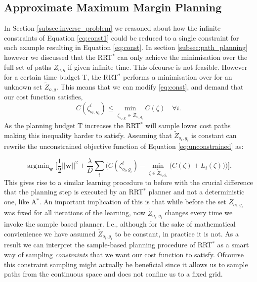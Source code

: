 \documentclass{article}  %
\DeclareMathOperator*{\argmin}{\arg\!\min}
\begin{document}
	\subsection{Approximate Maximum Margin Planning \label{subsec:ammp}}

		In Section \ref{subsec:inverse_problem}  we reasoned about how the infinite constraints of Equation \eqref{eq:const1} could be reduced to a single constraint for each example resulting in Equation \eqref{eq:const}. In section \ref{subsec:path_planning} however we discussed that the RRT$^*$ can only achieve the minimisation over the full set of paths $Z_{o,g}$ if given infinite time.
		This ofcourse is not feasible. However for a certain time budget T, the RRT$^*$ performs a minimisation over for an unknown set $\tilde{Z}_{o,g}$. This means that we can modify \eqref{eq:const}, and demand that our cost function satisfies,
\begin{equation}
	C(\zeta^i_{o_i,g_i}) \leq \min_{\zeta_{o_i,g_i} \in \tilde{Z}_{o_i,g_i}} C(\zeta) \quad \forall i. \label{eq:const_rrt}
\end{equation}
	As the planning budget T increases the RRT$^*$ will sample lower cost paths making this inequality harder to satisfy.
	Assuming that $\tilde{Z}_{o_i,g_i}$ is constant can rewrite the unconstrained objective function of Equation \eqref{eq:unconstrained} as:

	\begin{equation}
	\argmin_{\mathbf{w}} \big[ \frac{1}{2}||\mathbf{w}||^2 + \frac{\lambda}{D} \sum_i \big( C(\zeta^i_{o_i,g_i}) - \min_{\zeta \in \tilde{Z}_{o_i,g_i}}\big(C(\zeta) + L_i(\zeta)\big) \big) \big]. \label{eq:unconstrained_rrt}
	\end{equation}
	This gives rise to a similar learning procedure to before with the crucial difference that the planning step is executed by an RRT$^*$ planner and not a deterministic one, like A$^*$. An important implication of this is that while before the set $Z_{o_i,g_i}$ was fixed for all iterations of the learning, now $\tilde{Z}_{o_i,g_i}$ changes every time we invoke the sample based planner. I.e., although for the sake of mathematical convienience we have assumed $\tilde{Z}_{o_i,g_i}$ to be constant, in practice it is not. As a result we can interpret the sample-based planning procedure of RRT$^*$ as a smart way of sampling \emph{constraints} that we want our cost function to satisfy. Ofcourse this constraint sampling might actually be beneficial since it allows us to sample paths from the continuous space and does not confine us to a fixed grid.
\end{document}
